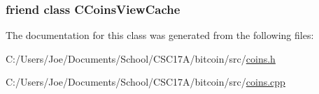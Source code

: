 \subsubsection[{C\+Coins\+View\+Cache}]{\setlength{\rightskip}{0pt plus 5cm}friend class {\bf C\+Coins\+View\+Cache}\hspace{0.3cm}{\ttfamily [friend]}}\label{class_c_coins_modifier_a1a8530a17e2e3f56e97217784400ee46}


The documentation for this class was generated from the following files\+:\begin{DoxyCompactItemize}
\item 
C\+:/\+Users/\+Joe/\+Documents/\+School/\+C\+S\+C17\+A/bitcoin/src/\hyperlink{coins_8h}{coins.\+h}\item 
C\+:/\+Users/\+Joe/\+Documents/\+School/\+C\+S\+C17\+A/bitcoin/src/\hyperlink{coins_8cpp}{coins.\+cpp}\end{DoxyCompactItemize}
